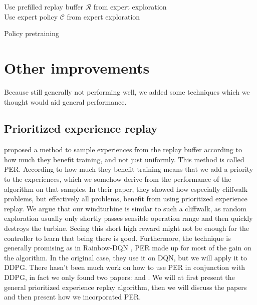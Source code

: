 \documentclass[hyperref,german,beleg]{cgvpub}
\begin{document}
\begin{algorithm}
\SetAlgoLined
Use prefilled replay buffer $\mathcal{R}$ from expert exploration\\
Use expert policy $\mathcal{C}$ from expert exploration\\
\caption{Policy pretraining}
\label{alg:pretrain}
\end{algorithm}

\section{Other improvements}

Because still generally not performing well, we added some techniques which we thought would aid general performance.

\subsection{Prioritized experience replay}

\cite{schaulPrioritizedExperienceReplay2016} proposed a method to sample experiences from the replay buffer according to how much they benefit training, and not just uniformly. This method is called \ac{PER}. According to how much they benefit training means that we add a priority to the experiences, which we somehow derive from the performance of the algorithm on that samples. In their paper, they showed how especially cliffwalk problems, but effectively all problems, benefit from using prioritized experience replay. We argue that our windturbine is similar to such a cliffwalk, as random exploration usually only shortly passes sensible operation range and then quickly destroys the turbine. Seeing this short high reward might not be enough for the controller to learn that being there is good. Furthermore, the technique is generally promising as in Rainbow-\ac{DQN} \cite{hesselRainbowCombiningImprovements2017}, \ac{PER} made up for most of the gain on the algorithm. In the original case, they use it on \ac{DQN}, but we will apply it to \ac{DDPG}. There hasn't been much work on how to use \ac{PER} in conjunction with \ac{DDPG}, in fact we only found two papers: \cite{houImprovingDDPGPrioritized} and \cite{zhaExperienceReplayOptimization2019}. We will at first present the general prioritized experience replay algorithm, then we will discuss the papers and then present how we incorporated \ac{PER}.
\end{document}
